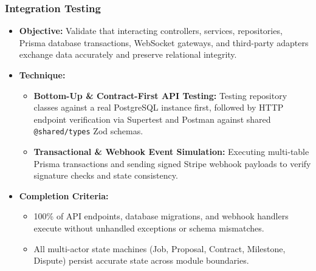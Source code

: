 \documentclass[12pt,a4paper]{article}
\begin{document}
\subsubsection{Integration Testing}
\begin{itemize}
  \item \textbf{Objective:} Validate that interacting controllers, services, repositories, Prisma database transactions, WebSocket gateways, and third-party adapters exchange data accurately and preserve relational integrity.
  \item \textbf{Technique:}
  \begin{itemize}
    \item \textbf{Bottom-Up \& Contract-First API Testing:} Testing repository classes against a real PostgreSQL instance first, followed by HTTP endpoint verification via Supertest and Postman against shared \texttt{@shared/types} Zod schemas.
    \item \textbf{Transactional \& Webhook Event Simulation:} Executing multi-table Prisma transactions and sending signed Stripe webhook payloads to verify signature checks and state consistency.
  \end{itemize}
  \item \textbf{Completion Criteria:}
  \begin{itemize}
    \item 100\% of API endpoints, database migrations, and webhook handlers execute without unhandled exceptions or schema mismatches.
    \item All multi-actor state machines (Job, Proposal, Contract, Milestone, Dispute) persist accurate state across module boundaries.
  \end{itemize}
\end{itemize}
\end{document}
